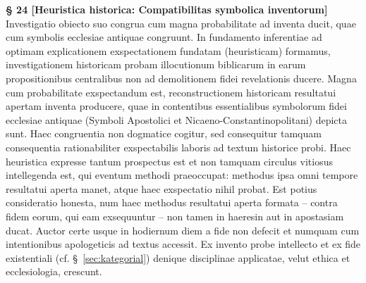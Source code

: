 \documentclass[11pt,a4paper]{article}
\makeatletter
\newcommand{\apthsec}[3]{%
  \phantomsection%
  \def\@currentlabel{#1}%
  \label{sec:#3}%
  \textbf{§ #1 [#2]}%
}
\makeatother
\begin{document}
\apthsec{24}{Heuristica historica: Compatibilitas symbolica inventorum}{heuristik-befund} Investigatio obiecto suo congrua cum magna probabilitate ad inventa ducit, quae cum symbolis ecclesiae antiquae congruunt. In fundamento inferentiae ad optimam explicationem exspectationem fundatam (heuristicam) formamus, investigationem historicam probam illocutionum biblicarum in earum propositionibus centralibus non ad demolitionem fidei revelationis ducere. Magna cum probabilitate exspectandum est, reconstructionem historicam resultatui apertam inventa producere, quae in contentibus essentialibus symbolorum fidei ecclesiae antiquae (Symboli Apostolici et Nicaeno-Constantinopolitani) depicta sunt. Haec congruentia non dogmatice cogitur, sed consequitur tamquam consequentia rationabiliter exspectabilis laboris ad textum historice probi. Haec heuristica expresse tantum prospectus est et non tamquam circulus vitiosus intellegenda est, qui eventum methodi praeoccupat: methodus ipsa omni tempore resultatui aperta manet, atque haec exspectatio nihil probat. Est potius consideratio honesta, num haec methodus resultatui aperta formata -- contra fidem eorum, qui eam exsequuntur -- non tamen in haeresin aut in apostasiam ducat. Auctor certe usque in hodiernum diem a fide non defecit et numquam cum intentionibus apologeticis ad textus accessit. Ex invento probe intellecto et ex fide existentiali (cf. §~\ref{sec:kategorial}) denique disciplinae applicatae, velut ethica et ecclesiologia, crescunt.
\end{document}

